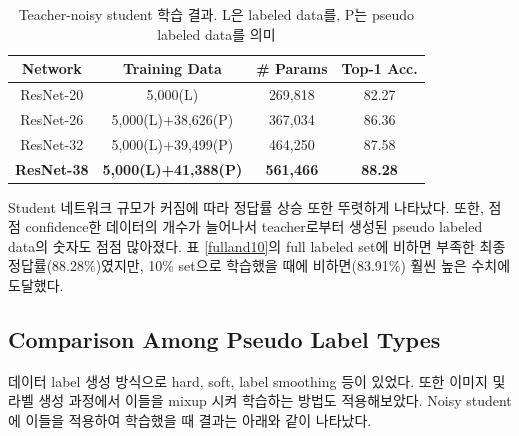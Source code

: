 \begin{table}[!h]
  \center
  \begin{tabular}{|c|c|c|c|}
\hline
Network & Training Data & \# Params & Top-1 Acc. \\ \hline
ResNet-20 & 5,000(L) & 269,818 & 82.27 \\ \hline
ResNet-26 & 5,000(L)+38,626(P) & 367,034 & 86.36 \\
ResNet-32 & 5,000(L)+39,499(P) & 464,250 & 87.58 \\
\textbf{ResNet-38} & \textbf{5,000(L)+41,388(P)} 
& \textbf{561,466} & \textbf{88.28} \\ \hline
  \end{tabular}
  \caption{Teacher-noisy student 학습 결과. L은 labeled data를, P는 pseudo labeled data를 의미}
  \label{noisyhard}
\end{table}

Student 네트워크 규모가 커짐에 따라 정답률 상승 또한 뚜렷하게 나타났다. 또한, 점점 confidence한 데이터의 개수가 늘어나서 teacher로부터 생성된 pseudo labeled data의 숫자도 점점 많아졌다. 표 \ref{fulland10}의 full labeled set에 비하면 부족한 최종 정답률(88.28\%)였지만, 10\% set으로 학습했을 때에 비하면(83.91\%) 훨씬 높은 수치에 도달했다.

\subsection{Comparison Among Pseudo Label Types}

데이터 label 생성 방식으로 hard, soft, label smoothing 등이 있었다. 또한 이미지 및 라벨 생성 과정에서 이들을 mixup 시켜 학습하는 방법도 적용해보았다. Noisy student에 이들을 적용하여 학습했을 때 결과는 아래와 같이 나타났다.

